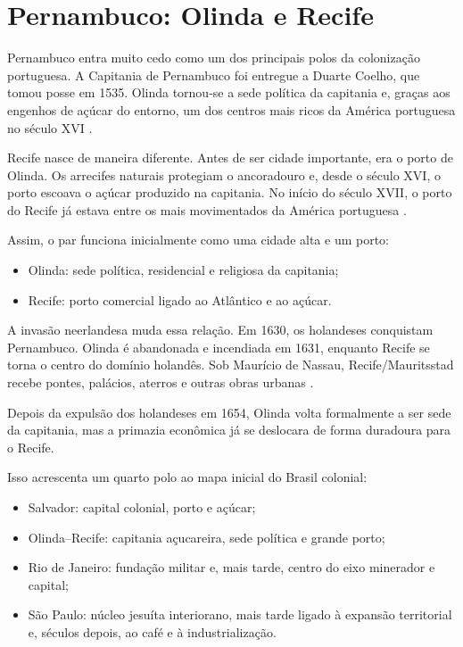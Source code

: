 \section{Pernambuco: Olinda e Recife}
\label{section-pernambuco-olinda-recife}

Pernambuco entra muito cedo como um dos
principais polos da colonização portuguesa.
A Capitania de Pernambuco foi entregue a
Duarte Coelho, que tomou posse em 1535.
Olinda tornou-se a sede política da
capitania e, graças aos engenhos de açúcar
do entorno, um dos centros mais ricos da
América portuguesa no século XVI
\cite{olinda-historia}.

Recife nasce de maneira diferente. Antes de
ser cidade importante, era o porto de
Olinda. Os arrecifes naturais protegiam o
ancoradouro e, desde o século XVI, o porto
escoava o açúcar produzido na capitania.
No início do século XVII, o porto do Recife
já estava entre os mais movimentados da
América portuguesa \cite{recife-historia}.

Assim, o par funciona inicialmente como uma
cidade alta e um porto:
\begin{itemize}
\item Olinda: sede política, residencial e
religiosa da capitania;
\item Recife: porto comercial ligado ao
Atlântico e ao açúcar.
\end{itemize}

A invasão neerlandesa muda essa relação. Em
1630, os holandeses conquistam Pernambuco.
Olinda é abandonada e incendiada em 1631,
enquanto Recife se torna o centro do
domínio holandês. Sob Maurício de Nassau,
Recife/Mauritsstad recebe pontes, palácios,
aterros e outras obras urbanas
\cite{olinda-historia,recife-historia}.

Depois da expulsão dos holandeses em 1654,
Olinda volta formalmente a ser sede da
capitania, mas a primazia econômica já se
deslocara de forma duradoura para o Recife.

Isso acrescenta um quarto polo ao mapa
inicial do Brasil colonial:
\begin{itemize}
\item Salvador: capital colonial, porto e
açúcar;
\item Olinda--Recife: capitania açucareira,
sede política e grande porto;
\item Rio de Janeiro: fundação militar e,
mais tarde, centro do eixo minerador e
capital;
\item São Paulo: núcleo jesuíta interiorano,
mais tarde ligado à expansão territorial e,
séculos depois, ao café e à
industrialização.
\end{itemize}

